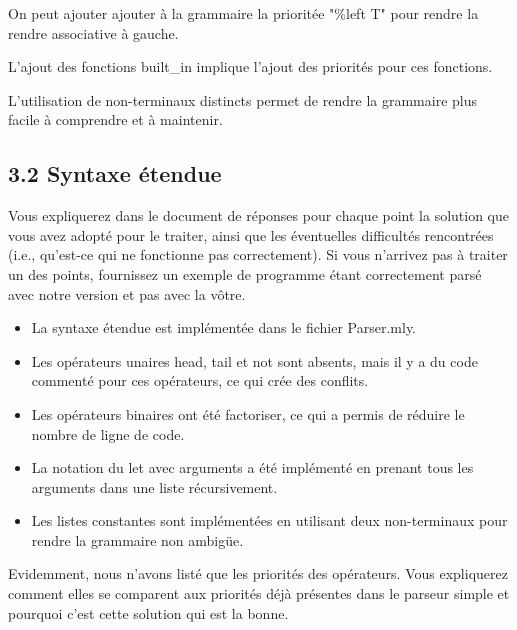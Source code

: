 \documentclass{article}
\begin{document}
{
  On peut ajouter ajouter à la grammaire la prioritée "\%left T" pour rendre la rendre associative à gauche.
}
{}


{
  L'ajout des fonctions built\_in implique l'ajout des priorités pour ces fonctions.
}
{}

{
  L'utilisation de non-terminaux distincts permet de rendre la grammaire plus facile à comprendre et à maintenir.
}
{}

\subsection{3.2 Syntaxe étendue}

Vous expliquerez dans le document de réponses pour chaque point la solution
que vous avez adopté pour le traiter, ainsi que les éventuelles difficultés
rencontrées (i.e., qu'est-ce qui ne fonctionne pas correctement). Si vous
n'arrivez pas à traiter un des points, fournissez un exemple de programme
étant correctement parsé avec notre version et pas avec la vôtre.\\

\begin{itemize}
  \item La syntaxe étendue est implémentée dans le fichier Parser.mly.
  \item Les opérateurs unaires head, tail et not sont absents, mais il y a du code commenté pour ces opérateurs, ce qui crée des conflits.
  \item Les opérateurs binaires ont été factoriser, ce qui a permis de réduire le nombre de ligne de code.
  \item La notation du let avec arguments a été implémenté en prenant tous les arguments dans une liste récursivement.
  \item Les listes constantes sont implémentées en utilisant deux non-terminaux pour rendre la grammaire non ambigüe.\\
\end{itemize}

Evidemment, nous n'avons listé que les priorités des opérateurs. Vous
expliquerez comment elles se comparent aux priorités déjà présentes dans le
parseur simple et pourquoi c'est cette solution qui est la bonne.
\end{document}
